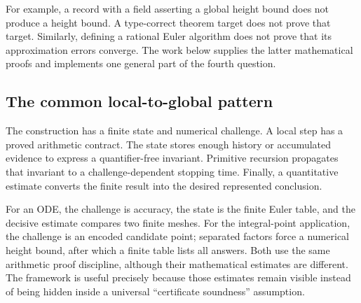 For example, a record with a field asserting a global height bound does
not produce a height bound. A type-correct theorem target does not prove
that target. Similarly, defining a rational Euler algorithm does not prove
that its approximation errors converge. The work below supplies the latter
mathematical proofs and implements one general part of the fourth question.

\subsection{The common local-to-global pattern}

The construction has a finite state and numerical challenge. A local step
has a proved arithmetic contract. The state stores enough history or
accumulated evidence to express a quantifier-free invariant. Primitive
recursion propagates that invariant to a challenge-dependent stopping time.
Finally, a quantitative estimate converts the finite result into the desired
represented conclusion.

For an ODE, the challenge is accuracy, the state is the finite Euler table,
and the decisive estimate compares two finite meshes. For the integral-point
application, the challenge is an encoded candidate point; separated factors
force a numerical height bound, after which a finite table lists all answers.
Both use the same arithmetic proof discipline, although their mathematical
estimates are different. The framework is useful precisely because those
estimates remain visible instead of being hidden inside a universal
``certificate soundness'' assumption.
